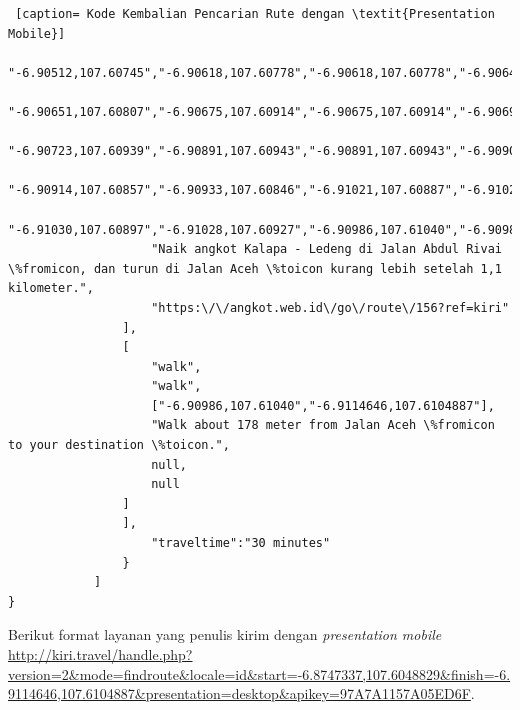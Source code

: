 \begin{lstlisting} [caption= Kode Kembalian Pencarian Rute dengan \textit{Presentation Mobile}]
					"-6.90512,107.60745","-6.90618,107.60778","-6.90618,107.60778","-6.90643,107.60787",
					"-6.90651,107.60807","-6.90675,107.60914","-6.90675,107.60914","-6.90694,107.60939",
					"-6.90723,107.60939","-6.90891,107.60943","-6.90891,107.60943","-6.90909,107.60934",
					"-6.90914,107.60857","-6.90933,107.60846","-6.91021,107.60887","-6.91021,107.60887",
					"-6.91030,107.60897","-6.91028,107.60927","-6.90986,107.61040","-6.90986,107.61040"],
					"Naik angkot Kalapa - Ledeng di Jalan Abdul Rivai \%fromicon, dan turun di Jalan Aceh \%toicon kurang lebih setelah 1,1 kilometer.",
					"https:\/\/angkot.web.id\/go\/route\/156?ref=kiri"
				],
				[
					"walk",
					"walk",
					["-6.90986,107.61040","-6.9114646,107.6104887"],
					"Walk about 178 meter from Jalan Aceh \%fromicon to your destination \%toicon.",
					null,
					null
				]
				],
					"traveltime":"30 minutes"
				}
			]
}
\end{lstlisting}

Berikut format layanan yang penulis kirim dengan \textit{presentation mobile} \url{http://kiri.travel/handle.php?version=2&mode=findroute&locale=id&start=-6.8747337,107.6048829&finish=-6.9114646,107.6104887&presentation=desktop&apikey=97A7A1157A05ED6F}.\\


